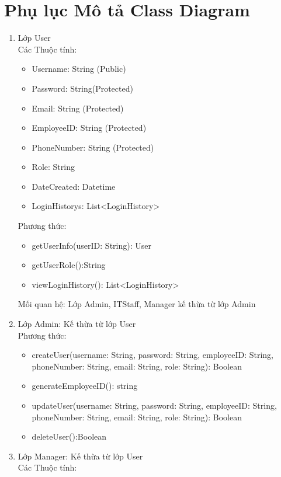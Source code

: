 \section{Phụ lục Mô tả Class Diagram}
\begin{enumerate}
    \item Lớp User\\
     Các Thuộc tính:
    \begin{itemize}[label=--]
        \item Username: String (Public)
        \item Password: String(Protected)
        \item Email: String (Protected)
        \item EmployeeID: String (Protected)
        \item PhoneNumber: String (Protected)
        \item Role: String
        \item DateCreated: Datetime
        \item LoginHistorys: List<LoginHistory>
    \end{itemize}
    Phương thức:
    \begin{itemize}[label=--]
        \item getUserInfo(userID: String):  User
        \item getUserRole():String
        \item viewLoginHistory(): List<LoginHistory>
    \end{itemize}
    Mối quan hệ: Lớp Admin, ITStaff, Manager kế thừa từ lớp Admin
    \item Lớp Admin: Kế thừa từ lớp User\\
    Phương thức:
    \begin{itemize}[label=--]
        \item createUser(username: String, password: String, employeeID: String, phoneNumber: String, email: String, role: String): Boolean
        \item generateEmployeeID(): string
        \item updateUser(username: String, password: String, employeeID: String, phoneNumber: String, email: String, role: String): Boolean
        \item deleteUser():Boolean
    \end{itemize}
    \item Lớp Manager: Kế thừa từ lớp User\\
    Các Thuộc tính:
    \begin{itemize}[label=--]

\end{itemize}
\end{enumerate}
